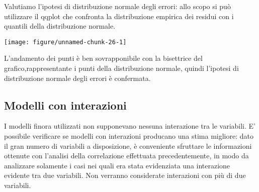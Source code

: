\documentclass{article}\usepackage[]{graphicx}\usepackage[]{color}
\makeatletter
\def\maxwidth{ %
  \ifdim\Gin@nat@width>\linewidth
    \linewidth
  \else
    \Gin@nat@width
  \fi
}
\newenvironment{knitrout}{}{} %
\makeatother
\begin{document}
Valutiamo l’ipotesi di distribuzione normale degli errori: allo scopo si può utilizzare
il qqplot che confronta la distribuzione empirica dei residui con i quantili della
distribuzione normale.

\begin{knitrout}
\color{fgcolor}
\texttt{[image: figure/unnamed-chunk-26-1]} 
\end{knitrout}

L'andamento dei punti è ben sovrapponibile con la bisettrice del grafico,rappresentante i punti della distribuzione normale, quindi l'ipotesi di distribuzione normale degli errori è confermata.

\subsection{Modelli con interazioni}
I modelli finora utilizzati non supponevano nessuna interazione tra le variabili.
E' possibile verificare se modelli con interazioni producano una stima migliore: dato il gran numero di variabili a disposizione, è conveniente sfruttare le informazioni ottenute con l'analisi della correlazione effettuata precedentemente, in modo da analizzare solamente i casi nei quali era stata evidenziata una interazione evidente tra due variabili.
Non verranno considerate interazioni con più di due variabili.
\end{document}
